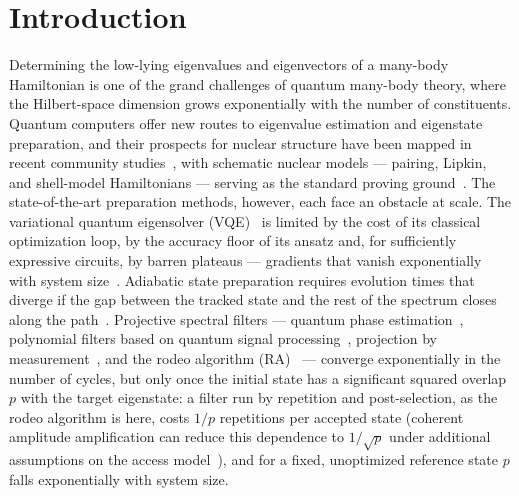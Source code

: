 \documentclass[
  aps,            %
  prc,            %
  reprint,        %
  superscriptaddress,
  floatfix,
  nofootinbib
]{revtex4-2}
\begin{document}
\maketitle



\section{Introduction}
Determining the low-lying eigenvalues and eigenvectors of a many-body Hamiltonian is
one of the grand challenges of quantum many-body theory, where the Hilbert-space
dimension grows exponentially with the number of constituents.  Quantum computers
offer new routes to eigenvalue estimation and eigenstate preparation, and their
prospects for nuclear structure have been mapped in recent community
studies~\cite{Beck2023,Bauer2023,LeeReview2023}, with schematic nuclear models ---
pairing, Lipkin, and shell-model Hamiltonians --- serving as the standard proving
ground~\cite{Ovrum2007,Hlatshwayo2022,Stetcu2022,PerezObiol2023,Jiang2023,Zhang2024,Lacroix2023}.
The state-of-the-art preparation methods, however, each face an obstacle at scale.
The variational quantum eigensolver (VQE)~\cite{Peruzzo2014} is limited by the cost
of its classical optimization loop, by the accuracy floor of its ansatz and, for
sufficiently expressive circuits, by barren plateaus --- gradients that vanish
exponentially with system size~\cite{McClean2018,Larocca2025}.  Adiabatic state
preparation requires evolution times that diverge if the gap between the tracked
state and the rest of the spectrum closes along the path~\cite{Albash2018}.
Projective spectral filters --- quantum phase estimation~\cite{Abrams1999},
polynomial filters based on quantum signal processing~\cite{LinTong2020,Dong2022},
projection by measurement~\cite{Stetcu2023}, and the rodeo algorithm
(RA)~\cite{Choi2021,Qian2024,Cohen2023,BeeLindgren2022,Patkowski2026} --- converge
exponentially in the number of cycles, but only once the initial state has a
significant squared overlap $p$ with the target eigenstate: a filter run by
repetition and post-selection, as the rodeo algorithm is here, costs $1/p$
repetitions per accepted state (coherent amplitude amplification can reduce
this dependence to $1/\sqrt p$ under additional assumptions on the access
model~\cite{LinTong2020}), and for a fixed, unoptimized reference state $p$
falls exponentially with system size.
\end{document}
